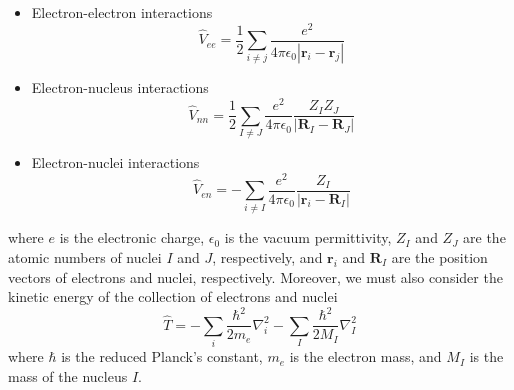 \begin{itemize}
\item Electron-electron interactions 
  \begin{equation}
    \label{eq1}
    \hat{V}_{ee} = \frac{1}{2} \sum_{i\neq j} \frac{e^2}{4\pi\epsilon_0 |\mathbf{r}_i - \mathbf{r}_j|}
  \end{equation}
\item Electron-nucleus interactions 
  \begin{equation}
    \label{eq2}
    \hat{V}_{nn} = \frac{1}{2} \sum_{I\neq J} \frac{e^2}{4\pi\epsilon_0} \frac{Z_I Z_J}{|\mathbf{R}_I - \mathbf{R}_J|}
  \end{equation}
\item Electron-nuclei interactions 
\begin{equation}
    \label{eq3}
    \hat{V}_{en} = -\sum_{i\neq I} \frac{e^2}{4\pi\epsilon_0} \frac{Z_I}{|\mathbf{r}_i - \mathbf{R}_I|}
  \end{equation}
\end{itemize}

where $e$ is the electronic charge, $\epsilon_0$ is the vacuum permittivity, $Z_I$ and $Z_J$ are the atomic numbers of nuclei $I$ and $J$, respectively, and $\mathbf{r}_i$ and $\mathbf{R}_I$ are the position vectors of electrons and nuclei, respectively. Moreover, we must also consider the kinetic energy of the collection of electrons and nuclei
\begin{equation}
    \label{eq4}
    \hat{T} = -\sum_i \frac{\hbar^2}{2m_e} \nabla_i^2 - \sum_I \frac{\hbar^2}{2M_I} \nabla_I^2
\end{equation}
where $\hbar$ is the reduced Planck's constant, $m_e$ is the electron mass, and $M_I$ is the mass of the nucleus $I$.

